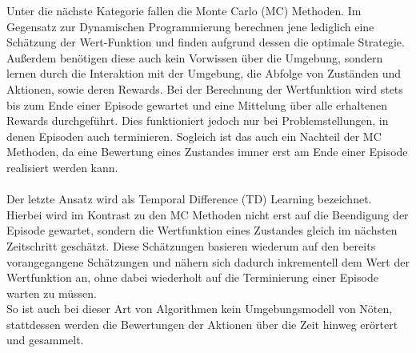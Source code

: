 Unter die nächste Kategorie fallen die Monte Carlo (MC) Methoden. 
Im Gegensatz zur Dynamischen Programmierung berechnen jene lediglich eine Schätzung der Wert-Funktion und finden aufgrund dessen die optimale Strategie. Außerdem benötigen diese auch kein Vorwissen über die Umgebung, sondern lernen durch die Interaktion mit der Umgebung, die Abfolge von Zuständen und Aktionen, sowie deren Rewards. Bei der Berechnung der Wertfunktion wird stets bis zum Ende einer Episode gewartet und eine Mittelung über alle erhaltenen Rewards durchgeführt. Dies funktioniert jedoch nur bei Problemstellungen, in denen Episoden auch terminieren. Sogleich ist das auch ein Nachteil der MC Methoden, da eine Bewertung eines Zustandes immer erst am Ende einer Episode realisiert werden kann.\\\\
Der letzte Ansatz wird als Temporal Difference (TD) Learning bezeichnet. 
Hierbei wird im Kontrast zu den MC Methoden nicht erst auf die Beendigung der Episode gewartet, sondern die Wertfunktion eines Zustandes gleich im nächsten Zeitschritt geschätzt. Diese Schätzungen basieren wiederum auf den bereits vorangegangene Schätzungen und nähern sich dadurch inkrementell dem  Wert der Wertfunktion an, ohne dabei wiederholt auf die Terminierung einer Episode warten zu müssen. \\
So ist auch bei dieser Art von Algorithmen kein Umgebungsmodell von Nöten, stattdessen werden die Bewertungen der Aktionen über die Zeit hinweg erörtert und gesammelt.
